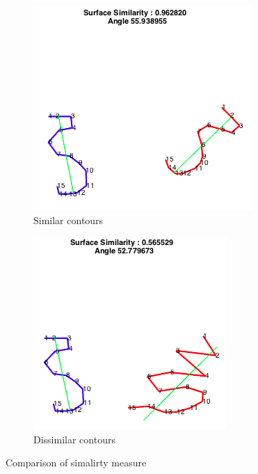 \documentclass[11]{article}
\begin{document}
\begin{figure}[h]
  \centering
  \begin{subfigure}{.5\textwidth}
    \includegraphics[width=1\linewidth]{figures/correlation_2D.png}
    \caption{Similar contours}
    \label{fig:correlation_2D}
  \end{subfigure}
  \begin{subfigure}{.44\textwidth}
    \includegraphics[width=1\linewidth]{figures/no_correlation_2D.png}
    \caption{Dissimilar contours}
    \label{fig:no_correlation_2D}
  \end{subfigure}
  \caption{Comparison of simalirty measure}
\end{figure}
\end{document}
